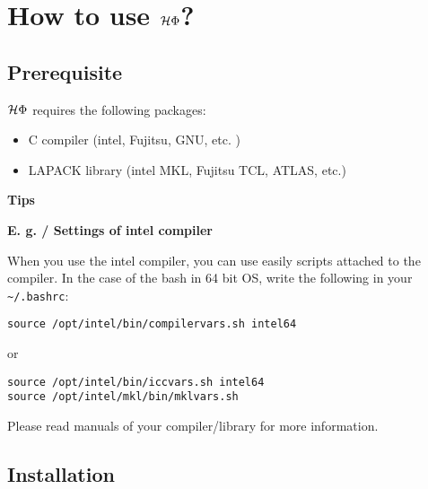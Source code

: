 \chapter{How to use $\mathcal{H} \Phi$?}
\label{Ch:HowTo}

\section{Prerequisite}

$\mathcal{H} \Phi$ requires the following packages:
\begin{itemize}
\item C compiler (intel, Fujitsu, GNU, etc. )
\item LAPACK library (intel MKL, Fujitsu TCL, ATLAS, etc.)
\end{itemize}

\begin{screen}
\Large 
{\bf Tips}
\normalsize

{\bf E. g. / Settings of intel compiler}

When you use the intel compiler, you can use easily scripts attached to the compiler.
In the case of the bash in 64 bit OS, write the following in your \verb|~/.bashrc|:
\begin{verbatim}
source /opt/intel/bin/compilervars.sh intel64
\end{verbatim}
or
\begin{verbatim}
source /opt/intel/bin/iccvars.sh intel64
source /opt/intel/mkl/bin/mklvars.sh
\end{verbatim}

Please read manuals of your compiler/library for more information.

\end{screen}

\section{Installation}

\label{Sec:HowToInstall}

